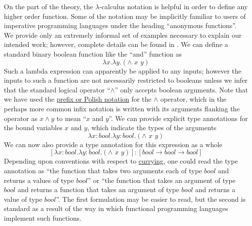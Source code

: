 On the part of the theory, the $\lambda$-calculus notation is helpful in
order to define any higher order function. Some of the notation may be
implicitly familiar to users of imperative programming languages under
the heading ``anonymous functions''. We provide only an extremely
informal set of examples necessary to explain our intended work;
however, complete details can be found in \cite{Barendregt1985}. We can define a
standard binary boolean function like the ``and'' function as
\begin{equation}\label{eq:bool}
\lambda x. \lambda y.(\wedge\,\,x\,\,y)
\end{equation}
Such a lambda expression can apparently be applied to any inputs;
however the inputs to such a function are not necessarily restricted to
booleans unless we infer that the standard logical operator
``$\wedge$'' only accepts boolean arguments.
Note that we have used the
\href{http://en.wikipedia.org/wiki/Polish\_notation}{prefix or Polish
notation} for the $\wedge$ operator, which
in the perhaps more common infix notation is written with its arguments
flanking the operator as $x \wedge y$ to mean
``$x$ and
$y$''. We can provide explicit type
annotations for the bound variables $x$
and $y$, which indicate the types of
the arguments
\begin{equation}\label{eq:booltype}
\lambda x:bool. \lambda y:bool.(\wedge\,\,x\,\,y)
\end{equation}
We can now also provide a type annotation for this expression as a whole
\begin{equation}\label{eq:boolfulltype}
[\lambda x:bool. \lambda y:bool.(\wedge\,\,x\,\,y)]:[bool \rightarrow bool \rightarrow bool]
\end{equation}
Depending upon conventions with respect to
\href{http://en.wikipedia.org/wiki/Currying}{currying}, one could read
the type annotation as ``the function that takes two arguments each of
type $bool$ and returns a values of type
$bool$'' or ``the function that takes an
argument of type $bool$ and returns a
function that takes an argument of type
$bool$ and returns a value of type
$bool$''. The first formulation may be
easier to read, but the second is standard as a result of the way in
which functional programming languages implement such functions.


